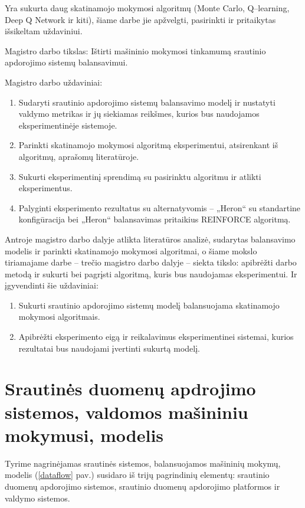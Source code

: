 \documentclass{VUMIFPSbakalaurinis}
\begin{document}
Yra sukurta daug skatinamojo mokymosi algoritmų (Monte Carlo, Q–learning, Deep Q Network ir kiti), šiame darbe jie apžvelgti, pasirinkti ir pritaikytas išsikeltam uždaviniui. 

Magistro darbo tikslas: Ištirti mašininio mokymosi tinkamumą srautinio apdorojimo sistemų balansavimui. 

Magistro darbo uždaviniai:
\begin{enumerate}
    \item Sudaryti srautinio apdorojimo sistemų balansavimo modelį ir nustatyti valdymo metrikas ir jų siekiamas reikšmes, kurios bus naudojamos eksperimentinėje sistemoje.
    \item Parinkti skatinamojo mokymosi algoritmą eksperimentui, atsirenkant iš algoritmų, aprašomų literatūroje.
    \item Sukurti eksperimentinį sprendimą su pasirinktu algoritmu ir atlikti eksperimentus.
    \item Palyginti eksperimento rezultatus su alternatyvomis – „Heron“ su standartine konfigūracija bei „Heron“ balansavimas pritaikius REINFORCE algoritmą. 
\end{enumerate}
Antroje magistro darbo dalyje atlikta literatūros analizė, sudarytas balansavimo modelis ir parinkti skatinamojo mokymosi algoritmai, o šiame mokslo tiriamajame darbe – trečio magistro darbo dalyje – siekta tikslo: apibrėžti darbo metodą ir sukurti bei pagrįsti algoritmą, kuris bus naudojamas eksperimentui. Ir įgyvendinti šie uždaviniai:
\begin{enumerate}
    \item Sukurti srautinio apdorojimo sistemų modelį balansuojama skatinamojo mokymosi algoritmais.
    \item Apibrėžti eksperimento eigą ir reikalavimus eksperimentinei sistemai, kurios rezultatai bus naudojami įvertinti sukurtą modelį. 
\end{enumerate}

\section{Srautinės duomenų apdrojimo sistemos, valdomos mašininiu mokymusi, modelis}

Tyrime nagrinėjamas srautinės sistemos, balansuojamos mašininių mokymų, modelis (\ref{dataflow} pav.) susidaro iš trijų pagrindinių elementų: srautinio duomenų apdorojimo sistemos, srautinio duomenų apdorojimo platformos ir valdymo sistemos. 
\end{document}
